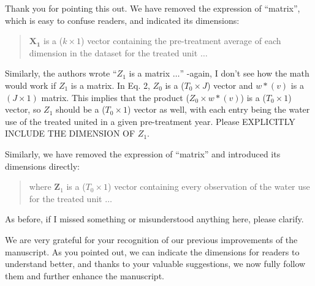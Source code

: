 \AR{} Thank you for pointing this out. We have removed the expression of ``matrix'', which is easy to confuse readers, and indicated its dimensions:

\begin{quote}
    $\mathbf{X_1}$ is a ($k \times 1$) vector containing the pre-treatment average of each dimension in the dataset for the treated unit $\dots$
\end{quote}

\RC{} Similarly, the authors wrote ``$Z_1$ is a matrix $\dots$'' -again, I don't see how the math would work if $Z_1$ is a matrix. In Eq. 2, $Z_0$ is a ($T_0 \times J$) vector and $w*(v)$ is a $(J \times 1)$ matrix. This implies that the product ($Z_0 \times w*(v)$) is a ($T_0 \times 1$) vector, so $Z_1$ should be a ($T_0 \times 1$) vector as well, with each entry being the water use of the treated united in a given pre-treatment year. Please EXPLICITLY INCLUDE THE DIMENSION OF $Z_1$.

\AR{} Similarly, we have removed the expression of ``matrix'' and introduced its dimensions directly:

\begin{quote}
    where $\mathbf{Z}_{1}$ is a ($T_0 \times 1$) vector containing every observation of the water use for the treated unit $\dots$
\end{quote}

As before, if I missed something or misunderstood anything here, please clarify.

\AR{} We are very grateful for your recognition of our previous improvements of the manuscript. As you pointed out, we can indicate the dimensions for readers to understand better, and thanks to your valuable suggestions, we now fully follow them and further enhance the manuscript.

